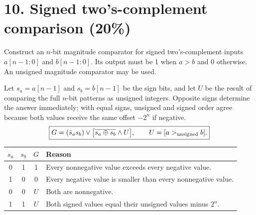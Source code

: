 \section{10. Signed two's-complement comparison (20\%)}
\begin{question}
Construct an $n$-bit magnitude comparator for signed two's-complement inputs $a[n-1:0]$ and $b[n-1:0]$. Its output must be 1 when $a>b$ and 0 otherwise. An unsigned magnitude comparator may be used.
\end{question}
\begin{solution}
Let $s_a=a[n-1]$ and $s_b=b[n-1]$ be the sign bits, and let $U$ be the result of comparing the full $n$-bit patterns as unsigned integers. Opposite signs determine the answer immediately; with equal signs, unsigned and signed order agree because both values receive the same offset $-2^n$ if negative.
\[
\boxed{G=(\bar s_a s_b)\vee
\bigl[\overline{s_a\oplus s_b}\wedge U\bigr],\qquad U=[a>_{\rm unsigned}b].}
\]
\begin{center}
\begin{tabular}{cccl}
\toprule
$s_a$&$s_b$&$G$&Reason\\
\midrule
0&1&1&Every nonnegative value exceeds every negative value.\\
1&0&0&Every negative value is smaller than every nonnegative value.\\
0&0&$U$&Both are nonnegative.\\
1&1&$U$&Both signed values equal their unsigned values minus $2^n$.\\
\bottomrule
\end{tabular}
\end{center}


\end{solution}
